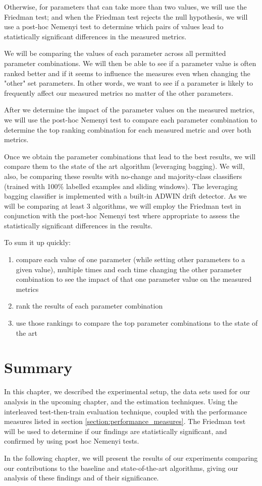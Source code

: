 Otherwise, for parameters that can take more than two values, we will use the Friedman test; and when the Friedman test rejects the null hypothesis, we will use a post-hoc Nemenyi test to determine which pairs of values lead to statistically significant differences in the measured metrics.

We will be comparing the values of each parameter across all permitted parameter combinations. We will then be able to see if a parameter value is often ranked better and if it seems to influence the measures even when changing the "other" set parameters. In other words, we want to see if a parameter is likely to frequently affect our measured metrics no matter of the other parameters.

After we determine the impact of the parameter values on the measured metrics, we will use the post-hoc Nemenyi test to compare each parameter combination to determine the top ranking combination for each measured metric and over both metrics.

Once we obtain the parameter combinations that lead to the best results, we will compare them to the state of the art algorithm (leveraging bagging). We will, also, be comparing these results with no-change and majority-class classifiers (trained with 100\% labelled examples and sliding windows). The leveraging bagging classifier is implemented with a built-in ADWIN drift detector. As we will be comparing at least 3 algorithms, we will employ the Friedman test in conjunction with the post-hoc Nemenyi test where appropriate to assess the statistically significant differences in the results.

To sum it up quickly:
\begin{enumerate}
\item compare each value of one parameter (while setting other parameters to a given value), multiple times and each time changing the other parameter combination to see the impact of that one parameter value on the measured metrics
\item rank the results of each parameter combination
\item use those rankings to compare the top parameter combinations to the state of the art
\end{enumerate}

\section{Summary}
In this chapter, we described the experimental setup, the data sets used for our analysis in the upcoming chapter, and the estimation techniques. Using the interleaved test-then-train evaluation technique, coupled with the performance measures listed in section \ref{section:performance_measures}. The Friedman test will be used to determine if our findings are statistically significant, and confirmed by using post hoc Nemenyi tests.

In the following chapter, we will present the results of our experiments comparing our contributions to the baseline and state-of-the-art algorithms, giving our analysis of these findings and of their significance.

